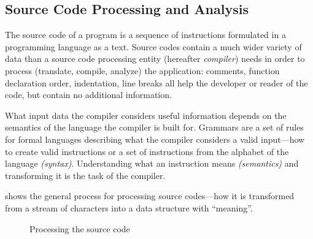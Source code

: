 \subsection{Source Code Processing and Analysis}
\label{sect:source-code-processing}
The source code of a program is a sequence of instructions formulated in a programming language as a text. Source codes contain a much wider variety of data than a source code processing entity (hereafter \emph{compiler}) needs in order to process (translate, compile, analyze) the application: comments, function declaration order, indentation, line breaks all help the developer or reader of the code, but contain no additional information.

What input data the compiler considers useful information depends on the semantics of the language the compiler is built for. Grammars are a set of rules for formal languages describing what the compiler considers a valid input---how to create valid instructions or a set of instructions from the alphabet of the language \emph{(syntax)}. Understanding what an instruction means \emph{(semantics)} and transforming it is the task of the compiler.

 shows the general process for processing source codes---how it is transformed from a stream of characters into a data structure with ``meaning''.

\begin{figure}[!ht]
	\centering
	 {
	}
	\caption{Processing the source code}
	\label{fig:processing-the-source-code}
\end{figure}

